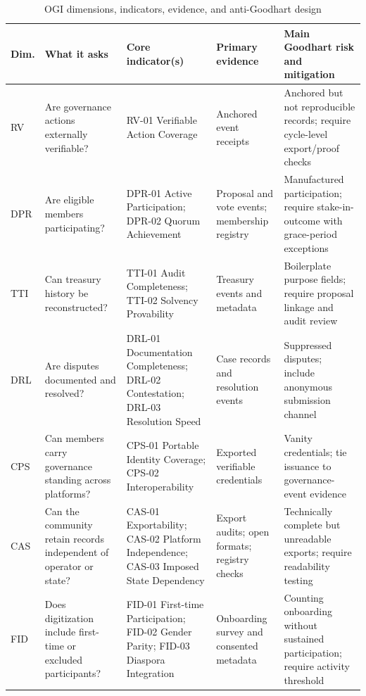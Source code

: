 \documentclass[sigconf,anonymous]{acmart}
\begin{document}
\begin{table}[t]
\caption{OGI dimensions, indicators, evidence, and anti-Goodhart design}
\label{tab:ogi}
\small
\begin{tabularx}{\textwidth}{>{\raggedright\arraybackslash}p{0.7cm} >{\raggedright\arraybackslash}p{2.6cm} >{\raggedright\arraybackslash}p{3.2cm} >{\raggedright\arraybackslash}p{2.7cm} Y}
\toprule
Dim. & What it asks & Core indicator(s) & Primary evidence & Main Goodhart risk and mitigation \\
\midrule
RV & Are governance actions externally verifiable? & RV-01 Verifiable Action Coverage & Anchored event receipts & Anchored but not reproducible records; require cycle-level export/proof checks \\
DPR & Are eligible members participating? & DPR-01 Active Participation; DPR-02 Quorum Achievement & Proposal and vote events; membership registry & Manufactured participation; require stake-in-outcome with grace-period exceptions \\
TTI & Can treasury history be reconstructed? & TTI-01 Audit Completeness; TTI-02 Solvency Provability & Treasury events and metadata & Boilerplate purpose fields; require proposal linkage and audit review \\
DRL & Are disputes documented and resolved? & DRL-01 Documentation Completeness; DRL-02 Contestation; DRL-03 Resolution Speed & Case records and resolution events & Suppressed disputes; include anonymous submission channel \\
CPS & Can members carry governance standing across platforms? & CPS-01 Portable Identity Coverage; CPS-02 Interoperability & Exported verifiable credentials & Vanity credentials; tie issuance to governance-event evidence \\
CAS & Can the community retain records independent of operator or state? & CAS-01 Exportability; CAS-02 Platform Independence; CAS-03 Imposed State Dependency & Export audits; open formats; registry checks & Technically complete but unreadable exports; require readability testing \\
FID & Does digitization include first-time or excluded participants? & FID-01 First-time Participation; FID-02 Gender Parity; FID-03 Diaspora Integration & Onboarding survey and consented metadata & Counting onboarding without sustained participation; require activity threshold \\
\bottomrule
\end{tabularx}
\end{table}
\end{document}
